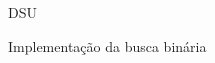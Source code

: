 \begin{frame}{DSU}
    
    \begin{block}{Implementação da busca binária}
        \footnotesize
        \inputminted{cpp}{codigos/dsu.cpp}    
    \end{block}

\end{frame}
